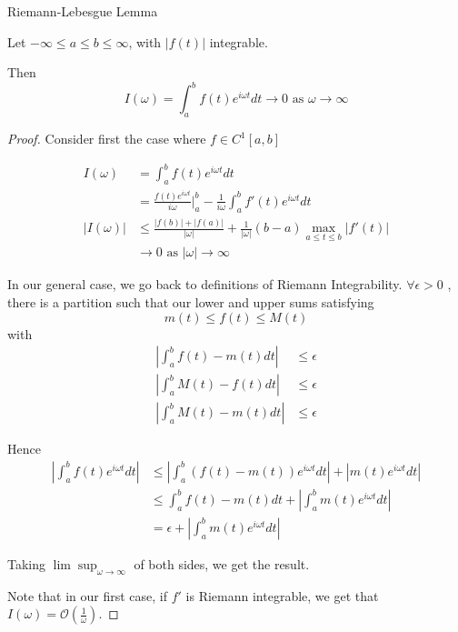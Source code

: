 \documentclass[a4paper]{article}
\begin{document}
\begin{lemma} Riemann-Lebesgue Lemma
	
	Let $-\infty \le a \le b \le  \infty$, with $|f(t)|$ integrable.

	Then
	\[
		I(\omega) = \int_{a}^{b} f(t) e^{i\omega t} dt \to 0 \text{ as } \omega \to \infty 
	\] 
\end{lemma}

\begin{proof}
	Consider first the case where $f \in C^{1}[a,b]$ 

	\begin{align*}
		I(\omega) &= \int_a^{b} f(t)e^{i\omega t} dt \\
			  &= \frac{f(t)e^{i\omega t}}{i\omega} \Bigg\rvert_{a}^{b} - \frac{1}{i\omega} \int_{a}^{b} f'(t) e^{i\omega t}dt \\
			  |I(\omega)| &\le  \frac{|f(b)| + |f(a)|}{|\omega|} + \frac{1}{|\omega|}(b-a) \max_{a\le t\le b} |f'(t)| \\
			  &\to 0 \text{ as } |\omega| \to \infty
	\end{align*}

	In our general case, we go back to definitions of Riemann Integrability. 
	$\forall \epsilon > 0$ , there is a partition such that our lower and upper sums satisfying 
	\[ 
		m(t) \le f(t) \le M(t)
	\]
	with
	\begin{align*}
		\left|\int_{a}^{b} f(t) - m(t) dt \right| &\le \epsilon \\
		\left| \int_a^{b} M(t) - f(t)  dt \right| &\le \epsilon \\
		\left| \int_a^{b} M(t) - m(t) dt \right| &\le \epsilon
	\end{align*}

	Hence
	\begin{align*}
		|\int_a^{b} f(t)e^{i\omega t}dt| &\le  \left|\int_a^{b} \left(f(t) - m(t)\right) e^{i\omega t} dt\right| + \left| m(t) e^{i\omega t} dt \right| \\
						 &\le  \int_a^{b}f(t) - m(t) dt + \left|\int_a^{b} m(t) e^{i\omega t} dt \right| \\
						 &= \epsilon + \left|\int_a^{b} m(t)e^{i\omega t} dt \right|
	\end{align*}

	Taking $\lim\sup_{\omega\to \infty}$ of both sides, we get the result.

	Note that in our first case, if $f'$ is Riemann integrable, we get that $I(\omega) = \mathcal{O}(\frac{1}{\omega})$.
\end{proof}
\end{document}
